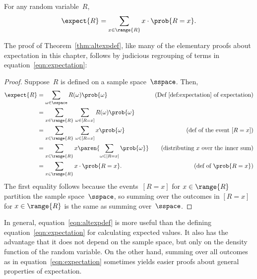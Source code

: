 \begin{theorem}\label{thm:altexpdef}
For any random variable~$R$,
\begin{equation}\label{eqn:altexpdef}
    \expect{R} = \sum_{x \in \range{R}} x \cdot \prob{R = x}.
\end{equation}
\end{theorem}
The proof of Theorem~\ref{thm:altexpdef}, like many of the elementary proofs
about expectation in this chapter, follows by judicious regrouping of terms
in equation~\ref{eqn:expectation}:
\begin{proof}
Suppose~$R$ is defined on a sample space~$\sspace$.  Then,
\begin{align*}
\expect{R}
    &= \sum_{\omega \in \sspace} R(\omega) \prob{\omega}
            &\text{(Def~\ref{def:expectation} of expectation)} \\
    &= \sum_{x \in \range{R}} \, \sum_{\omega \in [R=x]} R(\omega) \prob{\omega}
                \\
    &= \sum_{x \in \range{R}} \, \sum_{\omega \in [R=x]} x \prob{\omega}
            &\text{(def of the event $[R=x]$)}\\
    &= \sum_{x \in \range{R}} x \paren{\sum_{\omega \in [R=x]} \prob{\omega}}
            & \text{(distributing $x$ over the inner sum)} \\
    &= \sum_{x \in \range{R}} x \cdot \prob{R = x}.
            & \text{(def of $\prob{R=x}$)}
\end{align*}
The first equality follows because the events~$[R=x]$ for $x \in
\range{R}$ partition the sample space~$\sspace$, so summing over the
outcomes in $[R=x]$ for $x \in \range{R}$ is the same as summing
over~$\sspace$.
\end{proof}

In general, equation~\eqref{eqn:altexpdef} is more useful than the
defining equation~\eqref{eqn:expectation} for calculating expected
values.  It also has the advantage that it does not depend on the
sample space, but only on the density function of the random variable.
On the other hand, summing over all outcomes as in
equation~\eqref{eqn:expectation} sometimes yields easier proofs about
general properties of expectation.

